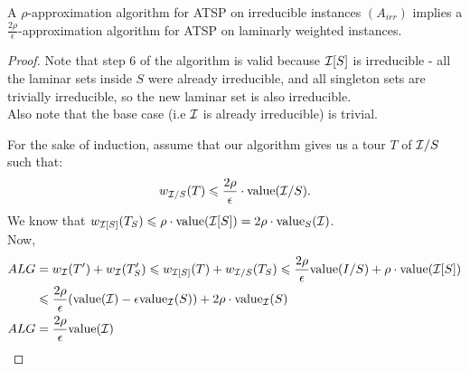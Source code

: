 \documentclass[./main.tex]{subfiles}
\begin{document}
	\begin{theorem} 
		A $\rho$-approximation algorithm for ATSP on irreducible instances $(A_{irr})$ implies a $\frac{2\rho}{\epsilon}$-approximation algorithm for ATSP on laminarly weighted instances.
	\end{theorem}
	\begin{proof}
		Note that step 6 of the algorithm is valid because $\mathcal{I}[S]$ is irreducible - all the laminar sets inside $S$ were already irreducible, and all singleton sets are trivially irreducible, so the new laminar set is also irreducible.\\
		Also note that the base case (i.e $\mathcal{I}$ is already irreducible) is trivial.

		For the sake of induction, assume that our algorithm gives us a tour $T$ of $\mathcal{I}/S$ such that:
		\[
			w_{\mathcal{I}/S}(T) \leqslant \frac{2\rho}{\epsilon}\cdot \textup{value}(\mathcal{I}/S).
		\]
		We know that $w_{\mathcal{I}[S]}(T_S)\leqslant \rho\cdot \textup{value}(\mathcal{I}[S]) = 2\rho\cdot\textup{value}_S(\mathcal{I})$.\\
		Now,
		\begin{align*}
				ALG &= w_{\mathcal{I}}(T') + w_{\mathcal{I}}(T_S') \leqslant w_{\mathcal{I}[S]}(T) + w_{\mathcal{I}/S}(T_S) \leqslant \frac{2\rho}{\epsilon}\textup{value}(I/S) + \rho\cdot \textup{value}(\mathcal{I}[S])\\
				&\leqslant \frac{2\rho}{\epsilon}(\textup{value}(\mathcal{I}) - \epsilon \textup{value}_{\mathcal{I}}(S)) + 2\rho\cdot\textup{value}_{\mathcal{I}}(S)\\
				ALG &= \frac{2\rho}{\epsilon} \textup{value}(\mathcal{I})
		\end{align*}
	\end{proof}
\end{document}
